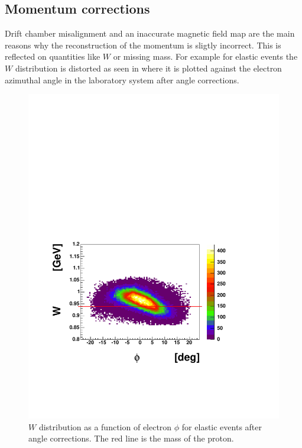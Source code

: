 \clearpage\newpage
\subsection{Momentum corrections} 
Drift chamber misalignment and an inaccurate magnetic field map
are the main reasons why the reconstruction of the momentum 
is sligtly incorrect. This is reflected on quantities like 
$W$ or missing mass. For example for elastic events
the $W$ distribution is distorted as seen in 
where it is plotted against the electron azimuthal angle in the laboratory system after angle corrections.
\begin{figure}[h]
 \begin{center}
 \includegraphics[width = 13cm, bb=0 120 550 480]{data_reduction/kine_corr/img/w_sec1_before}
 
  \caption[$W$ distribution as a function of electron $\phi$ for elastic events after angle corrections]
          { $W$ distribution as a function of electron $\phi$ for elastic events after angle corrections. 
                     The red line is the mass of the proton.}
 \label{fig:w_sec1_before}
 \end{center}
\end{figure}

